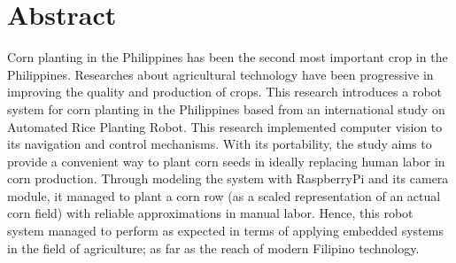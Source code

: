\chapter*{Abstract}

Corn planting in the Philippines has been the second most important crop in the Philippines. Researches about agricultural technology have been progressive in improving the quality and production of crops. This research introduces a robot system for corn planting in the Philippines based from an international study on Automated Rice Planting Robot. This research implemented computer vision to its navigation and control mechanisms. With its portability, the study aims to provide a convenient way to plant corn seeds in ideally replacing human labor in corn production. Through modeling the system with RaspberryPi and its camera module, it managed to plant a corn row (as a scaled representation of an actual corn field) with reliable approximations in manual labor. Hence, this robot system managed to perform as expected in terms of applying embedded systems in the field of agriculture; as far as the reach of modern Filipino technology.
